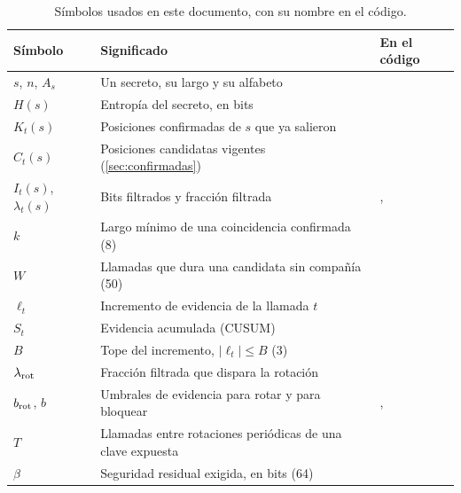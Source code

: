 \begin{table}[ht]
\caption{Símbolos usados en este documento, con su nombre en el código.}\label{tab:notacion}
\small
\begin{tabularx}{\textwidth}{@{}P{2.2cm}LP{4.4cm}@{}}
\toprule
Símbolo & Significado & En el código \\
\midrule
$s$, $n$, $A_s$ & Un secreto, su largo y su alfabeto &  \\
$H(s)$ & Entropía del secreto, en bits &  \\
$K_t(s)$ & Posiciones confirmadas de $s$ que ya salieron &  \\
$C_t(s)$ & Posiciones candidatas vigentes (\cref{sec:confirmadas}) &  \\
$I_t(s)$, $\lambda_t(s)$ & Bits filtrados y fracción filtrada & ,  \\
$k$ & Largo mínimo de una coincidencia confirmada (8) &  \\
$W$ & Llamadas que dura una candidata sin compañía (50) &  \\
$\ell_t$ & Incremento de evidencia de la llamada $t$ &  \\
$S_t$ & Evidencia acumulada (CUSUM) &  \\
$B$ & Tope del incremento, $|\ell_t| \leq B$ (3) &  \\
$\lambda_{\mathrm{rot}}$ & Fracción filtrada que dispara la rotación &  \\
$b_{\mathrm{rot}}$, $b$ & Umbrales de evidencia para rotar y para bloquear & ,  \\
$T$ & Llamadas entre rotaciones periódicas de una clave expuesta &  \\
$\beta$ & Seguridad residual exigida, en bits (64) &  \\
\bottomrule
\end{tabularx}
\end{table}
